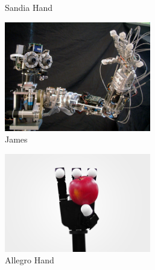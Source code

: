 \begin{figure}
\begin{subfigure}{.3\linewidth}
        \caption[Sandia Hand]{Sandia Hand \cite{SandiaHand}}
        \label{fig:Sandia}
    \end{subfigure}
    \begin{subfigure}{.3\linewidth}
        \centering
        \includegraphics[width=0.7\textwidth]{Images/James.png}    
        \caption[James]{James \cite{James}}
        \label{fig:James}
    \end{subfigure}
    \begin{subfigure}{.3\linewidth}
        \centering
        \includegraphics[width=0.7\textwidth]{Images/Allegro_Hand_flash_03.png}
        \caption[Allegro Hand]{Allegro Hand \cite{AllegroHandpic}}
        \label{fig:Allegro}
    \end{subfigure}
    \begin{subfigure}{.3\linewidth}
        \centering

\end{subfigure}
\end{figure}
